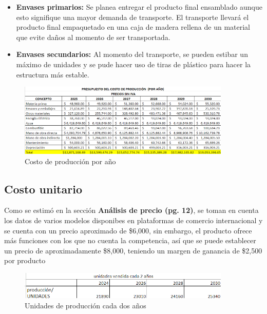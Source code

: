 \begin{itemize}
    \item \textbf{Envases primarios:} Se planea entregar el producto final ensamblado aunque esto signifique una mayor demanda de transporte. El transporte llevará el producto final empaquetado en una caja de madera rellena de un material que evite daños al momento de ser transportada.
    \item \textbf{Envases secundarios:} Al momento del transporte, se pueden estibar un máximo de unidades y se pude hacer uso de tiras de plástico para hacer la estructura más estable.
\end{itemize}



\begin{figure}[H]
    \centering	
    \includegraphics[angle=0,width=0.9\textwidth]{chapters/ELC_Produccion.png} 
    \caption{Costo de producción por año}
\label{fig:croquis190125}
\end{figure}



\subsection{Costo unitario}

Como se estimó en la sección \textbf{Análisis de precio (pg. 12)}, se toman en cuenta los datos de varios modelos disponibes en plataformas de comercio internacional y se cuenta con un precio aproximado de \$6,000, sin embargo, el producto ofrece más funciones con los que no cuenta la competencia, así que se puede establecer un precio de aproximadamente \$8,000, teniendo un margen de ganancia de \$2,500 por producto

\begin{figure}[H]
    \centering	
    \includegraphics[angle=0,width=0.9\textwidth]{chapters/ELC_Unidades+.png} 
    \caption{Unidades de producción cada dos años}
\label{fig:croquis190125}
\end{figure}

